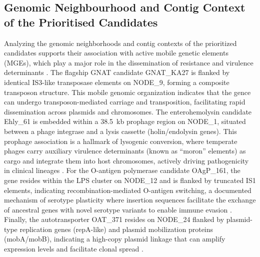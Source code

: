 \documentclass[pdflatex,sn-mathphys-num]{sn-jnl}
\begin{document}
\subsection{Genomic Neighbourhood and Contig Context of the Prioritised Candidates}
Analyzing the genomic neighborhoods and contig contexts of the prioritized candidates supports their association with active mobile genetic elements (MGEs), which play a major role in the dissemination of resistance and virulence determinants \cite{partridge2018mobile,gillings2015class}. The flagship GNAT candidate GNAT\_KA27 is flanked by identical IS3-like transposase elements on NODE\_9, forming a composite transposon structure. This mobile genomic organization indicates that the gence can undergo transposon-mediated carriage and transposition, facilitating rapid dissemination across plasmids and chromosomes. The enterohemolysin candidate Ehly\_61 is embedded within a 38.5~kb prophage region on NODE\_1, situated between a phage integrase and a lysis cassette (holin/endolysin genes). This prophage association is a hallmark of lysogenic conversion, where temperate phages carry auxiliary virulence determinants (known as ``moron'' elements) as cargo and integrate them into host chromosomes, actively driving pathogenicity in clinical lineages \cite{erdogdu2026prophage,canchaya2003phage,brussow2004phage}. For the O-antigen polymerase candidate OAgP\_161, the gene resides within the LPS cluster on NODE\_12 and is flanked by truncated IS1 elements, indicating recombination-mediated O-antigen switching, a documented mechanism of serotype plasticity where insertion sequences facilitate the exchange of ancestral genes with novel serotype variants to enable immune evasion \cite{liu2020oantigen,goulding2010oantigenbiosynthesis}. Finally, the autotransporter OAT\_371 resides on NODE\_24 flanked by plasmid-type replication genes (repA-like) and plasmid mobilization proteins (mobA/mobB), indicating a high-copy plasmid linkage that can amplify expression levels and facilitate clonal spread \cite{carattoli2013plasmid,robertson2020mob}. 
\end{document}
